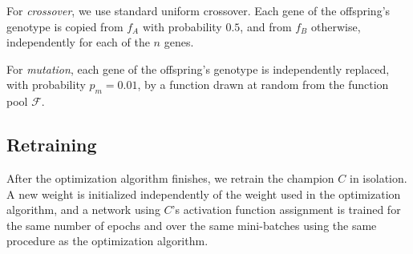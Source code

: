 For \emph{crossover}, we use standard uniform crossover. Each gene of the
offspring's genotype is copied from $f_A$ with probability $0.5$, and from
$f_B$ otherwise, independently for each of the $n$ genes.

For \emph{mutation}, each gene of the offspring's genotype is
independently replaced, with probability $p_m = 0.01$, by a function drawn
at random from the function pool $\mathcal{F}$.


\subsection{Retraining}
After the optimization algorithm finishes, we retrain the champion $C$ in isolation. 
A new weight is initialized independently of the weight used in the optimization algorithm, 
and a network using $C$'s activation function assignment is trained for the same number of epochs and over
the same mini-batches using the same procedure as the optimization algorithm.

